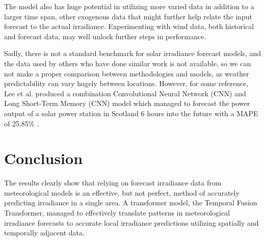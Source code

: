 The model also has huge potential in utilizing more varied data in addition to a larger time span, other exogenous data that might further help relate the input forecast to the actual irradiance. Experimenting with wind data, both historical and forecast data, may well unlock further steps in performance.

Sadly, there is not a standard benchmark for solar irradiance forecast models, and the data used by others who have done similar work is not available, so we can not make a proper comparison between methodologies and models, as weather predictability can vary hugely between locations. However, for some reference, Lee et al. produced a combination Convolutional Neural Network (CNN) and Long Short-Term Memory (CNN) model which managed to forecast the power output of a solar power station in Scotland 6 hours into the future with a MAPE of 25.85\% \cite{lee_forecasting_2018}.

\section{Conclusion\label{sec:conclusions}}
The results clearly show that relying on forecast irradiance data from meteorological models is an effective, but not perfect, method of accurately predicting irradiance in a single area. A transformer model, the Temporal Fusion Transformer, managed to effectively translate patterns in meteorological irradiance forecasts to accurate local irradiance predictions utilizing spatially and temporally adjacent data.\\
